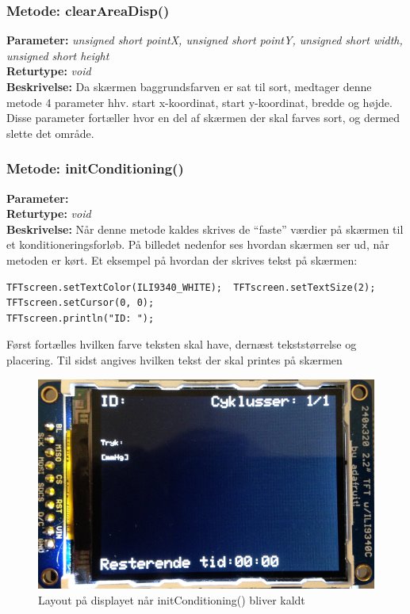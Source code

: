 \subsubsection{Metode: clearAreaDisp()}
\textbf{Parameter: } \textit{unsigned short pointX, unsigned short pointY, unsigned short width, unsigned short height}
\\ \textbf{Returtype: } \textit{void}
\\ \textbf{Beskrivelse: } Da skærmen baggrundsfarven er sat til sort, medtager denne metode 4 parameter hhv. start x-koordinat, start y-koordinat, bredde og højde. Disse parameter fortæller hvor en del af skærmen der skal farves sort, og dermed slette det område.

\subsubsection{Metode: initConditioning()}
\textbf{Parameter: }
\\ \textbf{Returtype: } \textit{void}
\\ \textbf{Beskrivelse: } Når denne metode kaldes skrives de “faste” værdier på skærmen til et konditioneringsforløb. På billedet nedenfor ses hvordan skærmen ser ud, når metoden er kørt. Et eksempel på hvordan der skrives tekst på skærmen: 
\begin{lstlisting}
TFTscreen.setTextColor(ILI9340_WHITE);  TFTscreen.setTextSize(2);
TFTscreen.setCursor(0, 0);
TFTscreen.println("ID: ");
\end{lstlisting}
Først fortælles hvilken farve teksten skal have, dernæst tekststørrelse og placering. Til sidst angives hvilken tekst der skal printes på skærmen

\begin{figure}[H]
	\includegraphics[width=\textwidth]{billeder/conditioning.png}
	\caption{Layout på displayet når initConditioning() bliver kaldt}\label{pic:conditiong}
\end{figure}

